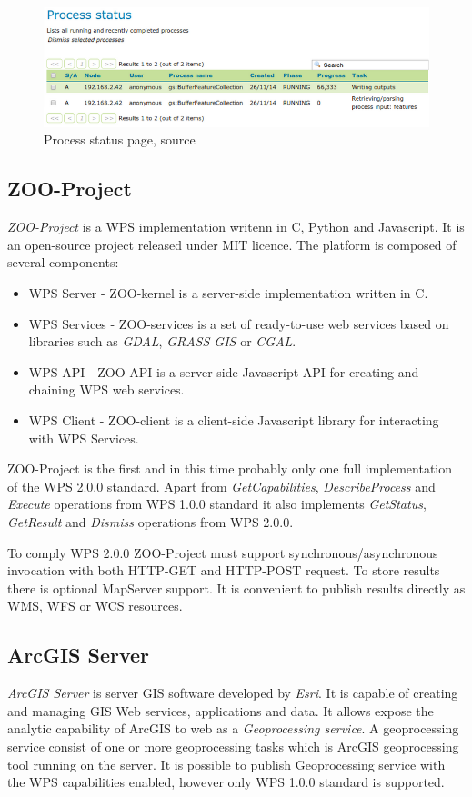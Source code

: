 \documentclass[12pt,a4paper]{article}
\begin{document}
\begin{figure}[h!]
\centering
\includegraphics[width=\textwidth]{img/geoserver_status.png}
\caption{Process status page, source \cite{GS_docs}}
\label{fig:geoserver_status}
\end{figure}

\subsection{ZOO-Project}
\textit{ZOO-Project} is a WPS implementation writenn in C, Python and Javascript. It is an open-source project released under MIT licence.
The platform is composed of several components:

\begin{itemize}
\item WPS Server - ZOO-kernel is a server-side implementation written in C.
\item WPS Services - ZOO-services is a set of ready-to-use web services based on libraries such as \textit{GDAL}, \textit{GRASS GIS}
or \textit{CGAL}.
\item WPS API - ZOO-API is a server-side Javascript API for creating and chaining WPS web services.
\item WPS Client - ZOO-client is a client-side Javascript library for interacting with WPS Services.
\end{itemize}

ZOO-Project is the first and in this time probably only one full implementation of the WPS 2.0.0 standard. Apart from \textit{GetCapabilities},
\textit{DescribeProcess} and \textit{Execute} operations from WPS 1.0.0 standard it also implements \textit{GetStatus}, \textit{GetResult}
and \textit{Dismiss} operations from WPS 2.0.0.

To comply WPS 2.0.0 ZOO-Project must support synchronous/asynchronous invocation with both HTTP-GET and HTTP-POST request. To store 
results there is optional MapServer support. It is convenient to publish results directly as WMS, WFS or WCS resources.

\subsection{ArcGIS Server}
\textit{ArcGIS Server} is server GIS software developed by \textit{Esri}. It is capable of creating and managing GIS Web services, applications and data. It allows expose the analytic capability of ArcGIS to web as a \textit{Geoprocessing service}. A geoprocessing
service consist of one or more geoprocessing tasks which is ArcGIS geoprocessing tool running on the server. It is possible to publish Geoprocessing service with the WPS capabilities enabled, however only WPS 1.0.0 standard is supported.
\end{document}
